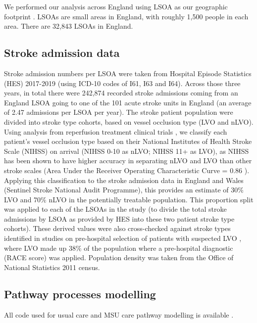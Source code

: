 We performed our analysis across England using LSOA as our geographic footprint \cite{ons}. LSOAs are small areas in England, with roughly 1,500 people in each area. There are 32,843 LSOAs in England.

\subsection{Stroke admission data}

Stroke admission numbers per LSOA were taken from Hospital Episode Statistics (HES) 2017-2019 (using ICD-10 codes of I61, I63 and I64). Across those three years, in total there were 242,874 recorded stroke admissions coming from an England LSOA going to one of the 101 acute stroke units in England (an average of 2.47 admissions per LSOA per year). The stroke patient population were divided into stroke type cohorts, based on vessel occlusion type (LVO and nLVO). Using analysis from reperfusion treatment clinical trials \cite{lees_time_2010, emberson_effect_2014, goyal_endovascular_2016, fransen_time_2016}, we classify each patient's vessel occlusion type based on their National Institutes of Health Stroke Scale (NIHSS) on arrival (NIHSS 0-10 as nLVO; NIHSS 11+ as LVO), as NIHSS has been shown to have higher accuracy in separating nLVO and LVO than other stroke scales (Area Under the Receiver Operating Characteristic Curve = 0.86 \cite{duvekot_comparison_2021}). Applying this classification to the stroke admission data in England and Wales (Sentinel Stroke National Audit Programme), this provides an estimate of 30\% LVO and 70\% nLVO in the potentially treatable population. This proportion split was applied to each of the LSOAs in the study (to divide the total stroke admissions by LSOA as provided by HES into these two patient stroke type cohorts). These derived values were also cross-checked against stroke types identified in studies on pre-hospital selection of patients with suspected LVO \cite{de_la_ossa_herrero_design_2013}, where LVO made up 38\% of the population where a pre-hospital diagnostic (RACE score) was applied. Population density was taken from the Office of National Statistics 2011 census.

\subsection{Pathway processes modelling}

All code used for usual care and MSU care pathway modelling is available \cite{github1}.

